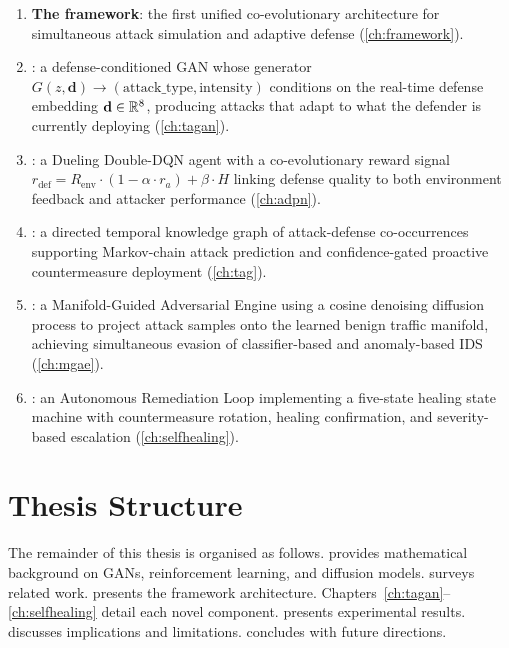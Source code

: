 \begin{enumerate}
  \item \textbf{The \caesar{} framework}: the first unified co-evolutionary
    architecture for simultaneous attack simulation and adaptive defense
    (\cref{ch:framework}).

  \item \textbf{\tagan{}}: a defense-conditioned GAN whose generator
    $G(z, \mathbf{d}) \to (\text{attack\_type}, \text{intensity})$ conditions
    on the real-time defense embedding $\mathbf{d} \in \mathbb{R}^8$,
    producing attacks that adapt to what the defender is currently deploying
    (\cref{ch:tagan}).

  \item \textbf{\adpn{}}: a Dueling Double-DQN agent with a co-evolutionary
    reward signal $r_{\mathrm{def}} = R_{\mathrm{env}} \cdot (1 - \alpha \cdot
    r_a) + \beta \cdot H$ linking defense quality to both environment feedback
    and attacker performance (\cref{ch:adpn}).

  \item \textbf{\tagraph{}}: a directed temporal knowledge graph of attack-defense
    co-occurrences supporting Markov-chain attack prediction and
    confidence-gated proactive countermeasure deployment (\cref{ch:tag}).

  \item \textbf{\mgae{}}: a Manifold-Guided Adversarial Engine using a cosine
    denoising diffusion process to project attack samples onto the learned
    benign traffic manifold, achieving simultaneous evasion of classifier-based
    and anomaly-based IDS (\cref{ch:mgae}).

  \item \textbf{\arl{}}: an Autonomous Remediation Loop implementing a
    five-state healing state machine with countermeasure rotation, healing
    confirmation, and severity-based escalation (\cref{ch:selfhealing}).
\end{enumerate}

\section{Thesis Structure}

The remainder of this thesis is organised as follows.
 provides mathematical background on GANs, reinforcement
learning, and diffusion models.
 surveys related work.
 presents the \caesar{} framework architecture.
Chapters~\ref{ch:tagan}--\ref{ch:selfhealing} detail each novel component.
 presents experimental results.
 discusses implications and limitations.
 concludes with future directions.

